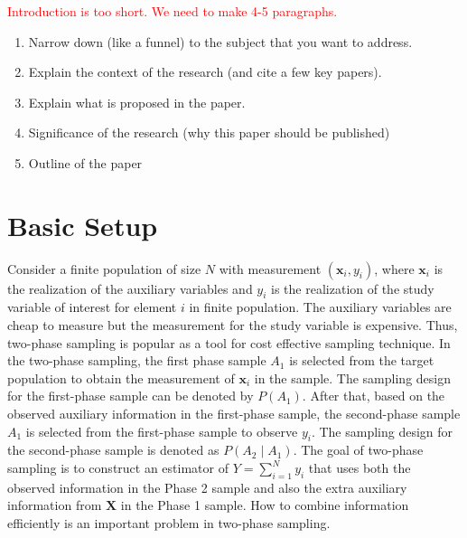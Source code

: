 \documentclass[12pt]{article}
\newcommand{\bx}{\mathbf{x}}
\renewcommand{\bf}[1]{\mathbf{#1}}
\begin{document}
\textcolor{red}{ Introduction is too short. We need to make 4-5 paragraphs. } 
\begin{enumerate}
\item Narrow down (like a funnel) to the subject that you want to address. 
\item Explain the context of the research (and cite a few key papers).
\item Explain what is proposed in the paper.  
\item Significance of the research (why this paper should be published)
\item Outline of the paper 
\end{enumerate}

\newpage 

\section{Basic Setup}

Consider a finite population of size $N$ 
with measurement  $(\bx_i, y_i)$, where $\bx_i$ is the realization of the auxiliary variables and $y_i$ is the realization of the study variable of interest for element  $i$ in finite population. The auxiliary variables are cheap to measure but the measurement for the study variable is expensive. Thus,  two-phase sampling is popular as a tool for cost effective sampling technique. In the two-phase sampling, the first phase sample $A_1$  is selected from the target population to obtain the measurement of $\bx_i$ in the sample. The sampling design for the first-phase sample can be denoted by $P(A_1)$. After that, based on the observed auxiliary information in the first-phase  sample, the second-phase sample $A_1$ is selected from the first-phase sample to observe $y_i$. The sampling design for the second-phase sample is denoted as $P( A_2 \mid A_1)$.  
The
goal of two-phase sampling is to construct an estimator of $Y =  \sum_{i=1}^N y_i$ 
that uses both the observed information in the Phase 2 sample and also the extra
auxiliary information from $\bf X$ in the Phase 1 sample. How to combine  information efficiently is an important problem in two-phase sampling. 
\end{document}
